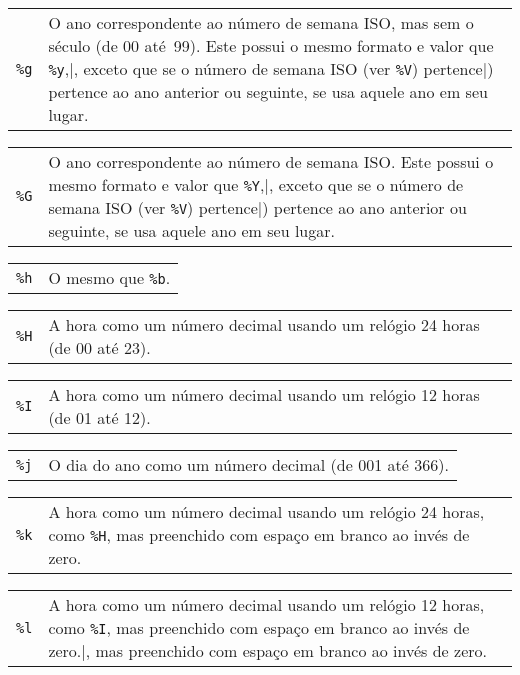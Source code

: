 \documentclass[11pt, brazil]{report}
\begin{document}
\begin{tabular}{@{}p{20pt}p{421.5pt}@{}}
{\tt\%g}&O ano correspondente ao número de semana ISO, mas sem o século
(de 00 até~99). Este possui o mesmo formato e valor que \verb|%y|,
exceto que se o número de semana ISO (ver \verb|%V|) pertence
ao ano anterior ou seguinte, se usa aquele ano em seu lugar.\\
\end{tabular}

\begin{tabular}{@{}p{20pt}p{421.5pt}@{}}
{\tt\%G}&O ano correspondente ao número de semana ISO.
Este possui o mesmo formato e valor que \verb|%Y|,
exceto que se o número de semana ISO (ver \verb|%V|) pertence
ao ano anterior ou seguinte, se usa aquele ano em seu lugar.\\
\end{tabular}

\begin{tabular}{@{}p{20pt}p{421.5pt}@{}}
{\tt\%h}&O mesmo que \verb|%b|.\\
\end{tabular}

\begin{tabular}{@{}p{20pt}p{421.5pt}@{}}
{\tt\%H}&A hora como um número decimal usando um relógio 24 horas (de 00 até 23).\\
\end{tabular}

\begin{tabular}{@{}p{20pt}p{421.5pt}@{}}
{\tt\%I}&A hora como um número decimal usando um relógio 12 horas (de 01 até 12).\\
\end{tabular}

\begin{tabular}{@{}p{20pt}p{421.5pt}@{}}
{\tt\%j}&O dia do ano como um número decimal (de 001 até 366).\\
\end{tabular}

\begin{tabular}{@{}p{20pt}p{421.5pt}@{}}
{\tt\%k}&A hora como um número decimal usando um relógio 24 horas, como
\verb|%H|, mas preenchido com espaço em branco ao invés de zero.\\
\end{tabular}

\begin{tabular}{@{}p{20pt}p{421.5pt}@{}}
{\tt\%l}&A hora como um número decimal usando um relógio 12 horas, como
\verb|%I|, mas preenchido com espaço em branco ao invés de zero.
\end{tabular}
\end{document}
